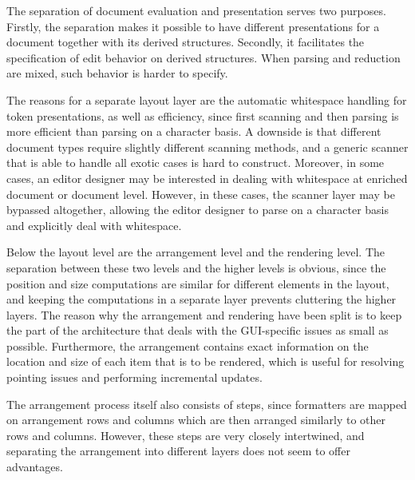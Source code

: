 The separation of document evaluation and presentation serves two purposes. Firstly, the separation makes it possible to have different presentations for a document together with its derived structures. Secondly, it facilitates the specification of edit behavior on derived structures. When parsing and reduction are mixed, such behavior is harder to specify.

The reasons for a separate layout layer are the automatic whitespace handling for token presentations, as well as efficiency, since first scanning and then parsing is more efficient than parsing on a character basis. A downside is that different document types require slightly different scanning methods, and a generic scanner that is able to handle all exotic cases is hard to construct. Moreover, in some cases, an editor designer may be interested in dealing with whitespace at enriched document or document level. However, in these cases, the scanner layer may be bypassed altogether, allowing the editor designer to parse on a character basis and explicitly deal with whitespace.

Below the layout level are the arrangement level and the rendering level. The separation between these two levels and the higher levels is obvious, since the position and size computations are similar for different elements in the layout, and keeping the computations in a separate layer prevents cluttering the higher layers. The reason why the arrangement and rendering have been split is to keep the part of the architecture that deals with the GUI-specific issues as small as possible. Furthermore, the arrangement contains exact information on the location and size of each item that is to be rendered, which is useful for resolving pointing issues and performing incremental updates. 

The arrangement process itself also consists of steps, since formatters are mapped on arrangement rows and columns which are then arranged similarly to other rows and columns. However, these steps are very closely intertwined, and separating the arrangement into different layers does not seem to offer advantages. 

